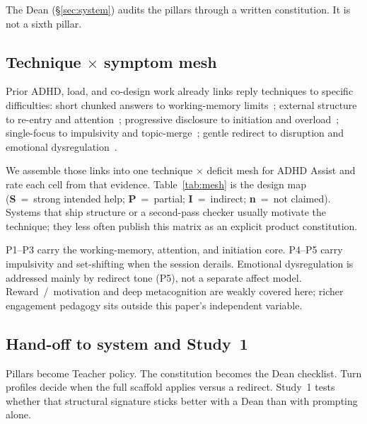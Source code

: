The Dean (\S\ref{sec:system}) audits the pillars through a written
constitution. It is not a sixth pillar.


\subsection{Technique $\times$ symptom mesh}
\label{sec:mesh}

Prior ADHD, load, and co-design work already links reply techniques to
specific difficulties: short chunked answers to working-memory
limits~\cite{cowan2010magical,sweller2011cognitive}; external structure to
re-entry and attention~\cite{barkley1997behavioral,w3c2021coga}; progressive
disclosure to initiation and overload~\cite{saha2023can,zhu2026scaffolding};
single-focus to impulsivity and topic-merge~\cite{shani2024multiturn}; gentle
redirect to disruption and emotional
dysregulation~\cite{zhu2026scaffolding,beheshti2020emotion,liu2024socraticlm}.

We assemble those links into one technique $\times$ deficit mesh for ADHD
Assist and rate each cell from that evidence. Table~\ref{tab:mesh} is the
design map (\textbf{S}~=~strong intended help; \textbf{P}~=~partial;
\textbf{I}~=~indirect; \textbf{n}~=~not claimed). Systems that ship structure
or a second-pass checker usually motivate the technique; they less often
publish this matrix as an explicit product constitution.

P1--P3 carry the working-memory, attention, and initiation core. P4--P5 carry
impulsivity and set-shifting when the session derails. Emotional dysregulation
is addressed mainly by redirect tone (P5), not a separate affect model.
Reward~/~motivation and deep metacognition are weakly covered here; richer
engagement pedagogy sits outside this paper's independent variable.

\subsection{Hand-off to system and Study~1}

Pillars become Teacher policy. The constitution becomes the Dean checklist.
Turn profiles decide when the full scaffold applies versus a redirect.
Study~1 tests whether that structural signature sticks better with a Dean
than with prompting alone.
